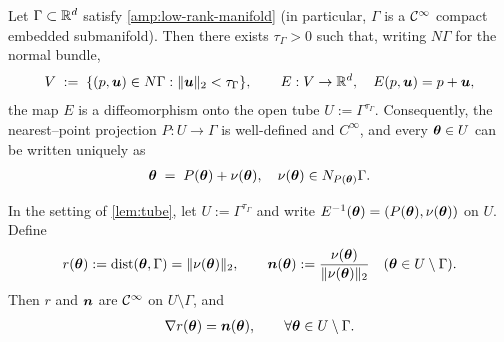 \begin{lemma}\label{lem:tube}
Let $\Gamma\subset\mathbb{R}^d$ satisfy \cref{amp:low-rank-manifold} (in particular, $\Gamma$ is a $\mathcal{C}^\infty$ compact embedded submanifold).
Then there exists $\tau_{\Gamma}>0$ such that, writing $N\Gamma$ for the normal bundle,
\begin{align*}
V \;:=\; \{(p,{\bm{u}})\in N\Gamma : \|{\bm{u}}\|_2<\tau_{\Gamma}\},\qquad
E:V\to\mathbb{R}^d,\quad E(p,{\bm{u}})=p+{\bm{u}},
\end{align*}
the map $E$ is a diffeomorphism onto the open tube $U:=\Gamma^{\tau_{\Gamma}}$.
Consequently, the nearest–point projection $P:U\to\Gamma$ is well-defined and $C^\infty$, and every ${\bm{\theta}}\in U$ can be written uniquely as
\begin{align*}
{\bm{\theta}} \;=\; P({\bm{\theta}})+\nu({\bm{\theta}}), \quad \nu({\bm{\theta}})\in N_{P({\bm{\theta}})}\Gamma.
\end{align*}
\end{lemma}

\begin{corollary}\label{cor:dist-normal}
In the setting of \cref{lem:tube}, let $U:=\Gamma^{\tau_\Gamma}$ and write
$E^{-1}({\bm{\theta}})=(P({\bm{\theta}}),\nu({\bm{\theta}}))$ on $U$. Define
\begin{align*}
  r({\bm{\theta}}):=\mathrm{dist}({\bm{\theta}},\Gamma)=\|\nu({\bm{\theta}})\|_2,\qquad
  {\bm{n}}({\bm{\theta}}):=\frac{\nu({\bm{\theta}})}{\|\nu({\bm{\theta}})\|_2} \quad ({\bm{\theta}}\in U\setminus\Gamma).
\end{align*}
Then $r$ and ${\bm{n}}$ are $\mathcal{C}^\infty$  on $U\setminus\Gamma$, and
\begin{align}\label{eq:grad-r-equals-n}
  \nabla r({\bm{\theta}})={\bm{n}}({\bm{\theta}}), \qquad\forall{\bm{\theta}}\in U\setminus\Gamma.
\end{align}
\end{corollary}

